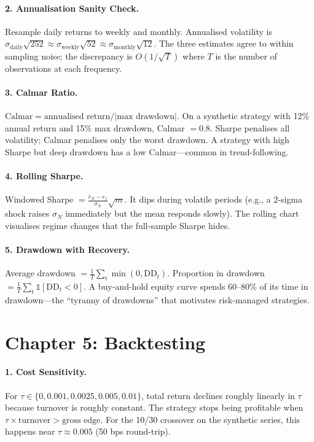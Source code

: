 \paragraph{2. Annualisation Sanity Check.}
Resample daily returns to weekly and monthly. Annualised volatility
is $\sigma_{\text{daily}} \sqrt{252} \approx
\sigma_{\text{weekly}} \sqrt{52} \approx
\sigma_{\text{monthly}} \sqrt{12}$. The three estimates agree to
within sampling noise; the discrepancy is $O(1/\sqrt{T})$ where $T$
is the number of observations at each frequency.

\paragraph{3. Calmar Ratio.}
$\text{Calmar} = \text{annualised return} / |\text{max drawdown}|$.
On a synthetic strategy with 12\% annual return and 15\% max
drawdown, Calmar $= 0.8$. Sharpe penalises all volatility; Calmar
penalises only the worst drawdown. A strategy with high Sharpe but
deep drawdown has a low Calmar---common in trend-following.

\paragraph{4. Rolling Sharpe.}
Windowed Sharpe $= \frac{\bar{r}_N - r_f}{\sigma_N} \sqrt{m}$. It
dips during volatile periods (e.g., a 2-sigma shock raises $\sigma_N$
immediately but the mean responds slowly). The rolling chart
visualises regime changes that the full-sample Sharpe hides.

\paragraph{5. Drawdown with Recovery.}
Average drawdown $= \frac{1}{T} \sum_t \min(0, \text{DD}_t)$.
Proportion in drawdown $= \frac{1}{T} \sum_t
\mathbb{1}[\text{DD}_t < 0]$. A buy-and-hold equity curve spends
60--80\% of its time in drawdown---the ``tyranny of drawdowns'' that
motivates risk-managed strategies.

\section*{Chapter 5: Backtesting}

\paragraph{1. Cost Sensitivity.}
For $\tau \in \{0, 0.001, 0.0025, 0.005, 0.01\}$, total return
declines roughly linearly in $\tau$ because turnover is roughly
constant. The strategy stops being profitable when
$\tau \times \text{turnover} > \text{gross edge}$. For the 10/30
crossover on the synthetic series, this happens near
$\tau \approx 0.005$ (50 bps round-trip).

